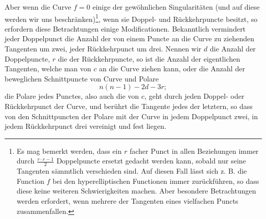 \documentclass[10pt]{article}
\begin{document}
Aber wenn die Curve $f=0$ einige der gewöhnlichen Singularitäten (und auf diese werden wir uns beschränken)\footnote{Es mag bemerkt werden, dass ein $r$ facher Punct in allen Beziehungen immer durch $\frac{r\cdot r-1}{2}$ Doppelpuncte ersetzt gedacht werden kann, sobald nur seine Tangenten sämmtlich verschieden sind. Auf diesen Fall lässt sich z. B. die Function $f$ bei den hyperelliptischen Functionen immer zurückführen, so dass diese keine weiteren Schwierigkeiten machen. Aber besondere Betrachtungen werden erfordert, wenn mehrere der Tangenten eines vielfachen Puncts zusammenfallen.}, wenn sie Doppel- und Rückkehrpuncte besitzt, so erfordern diese Betrachtungen einige Modificationen. Bekanntlich vermindert jeder Doppelpunct die Anzahl der von einem Puncte an die Curve zu ziehenden Tangenten um zwei, jeder Rückkehrpunct um drei. Nennen wir $d$ die Anzahl der Doppelpuncte, $r$ die der Rückkehrpuncte, so ist die Anzahl der eigentlichen Tangenten, welche man von $c$ an die Curve ziehen kann, oder die Anzahl der beweglichen Schnittpuncte von Curve und Polare
\[
n(n-1)-2d-3r;
\]
die Polare jedes Punctes, also auch die von $c$, geht durch jeden Doppel- oder Rückkehrpunct der Curve, und berührt die Tangente jedes der letztern, so dass von den Schnittpuncten der Polare mit der Curve in jedem Doppelpunct zwei, in jedem Rückkehrpunct drei vereinigt und fest liegen.
\end{document}

